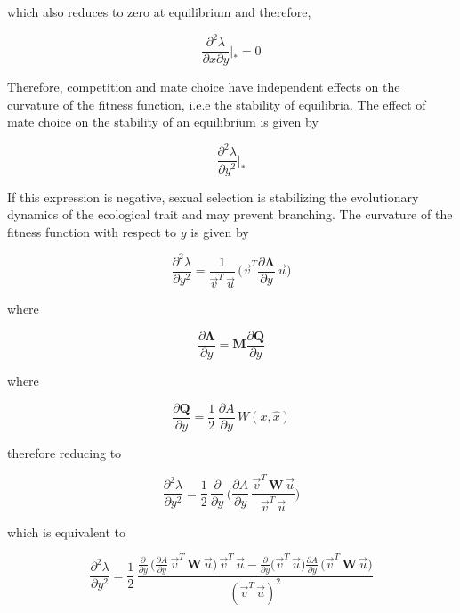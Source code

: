 which also reduces to zero at equilibrium and therefore, 

\begin{equation}
    \frac{\partial^2 \lambda}{\partial x \partial y}\bigg|_* = 0
\end{equation}

Therefore, competition and mate choice have independent effects on the curvature of the fitness function, i.e.e the stability of equilibria. The effect of mate choice on the stability of an equilibrium is given by

\begin{equation}
    \frac{\partial^2 \lambda}{\partial y^2}\bigg|_*
\end{equation}

If this expression is negative, sexual selection is stabilizing the evolutionary dynamics of the ecological trait and may prevent branching. The curvature of the fitness function with respect to $y$ is given by

\begin{equation}
    \frac{\partial^2 \lambda}{\partial y^2} = \frac{1}{\overrightarrow{v}^T\,\overrightarrow{u}}\,\bigg(\overrightarrow{v}^T\frac{\partial \pmb \Lambda}{\partial y}\,\overrightarrow{u}\bigg)
\end{equation}

where 

\begin{equation}
    \frac{\partial \pmb \Lambda}{\partial y} = \pmb M \frac{\partial \pmb Q}{\partial y}
\end{equation}

where

\begin{equation}
    \frac{\partial \pmb Q}{\partial y} = \frac{1}{2}\,\frac{\partial A}{\partial y}\,W(x,\hat x)
\end{equation}

therefore reducing to

\begin{equation}
    \frac{\partial^2 \lambda}{\partial y^2} = \frac{1}{2}\,\frac{\partial}{\partial y}\,\bigg(\frac{\partial A}{\partial y}\, \frac{\overrightarrow{v}^T\,\pmb W\,\overrightarrow{u}}{\overrightarrow{v}^T\,\overrightarrow{u}}\bigg)
\end{equation}

which is equivalent to

\begin{equation}
    \frac{\partial^2 \lambda}{\partial y^2} = \frac{1}{2}\,\frac{\frac{\partial}{\partial y}\,\Big(\frac{\partial A}{\partial y}\,\overrightarrow{v}^T\,\pmb W\,\overrightarrow{u}\Big)\,\overrightarrow{v}^T\,\overrightarrow{u}-\frac{\partial}{\partial y}\Big(\overrightarrow{v}^T\,\overrightarrow{u}\Big)\frac{\partial A}{\partial y}\,\Big(\overrightarrow{v}^T\,\pmb W\,\overrightarrow{u}\Big)}{(\overrightarrow{v}^T\,\overrightarrow{u})^2}
\end{equation}

